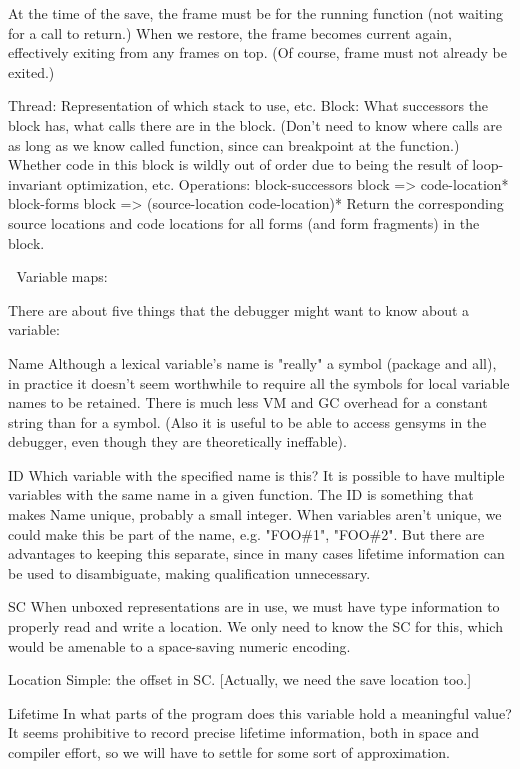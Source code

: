 	    At the time of the save, the frame must be for the running function
	    (not waiting for a call to return.)  When we restore, the frame
	    becomes current again, effectively exiting from any frames on top.
	    (Of course, frame must not already be exited.)
       
Thread:
        Representation of which stack to use, etc.
Block:
        What successors the block has, what calls there are in the block.
        (Don't need to know where calls are as long as we know called function,
        since can breakpoint at the function.)  Whether code in this block is
        wildly out of order due to being the result of loop-invariant
        optimization, etc.  Operations:
        block-successors block => code-location*
        block-forms block => (source-location code-location)*
            Return the corresponding source locations and code locations for
            all forms (and form fragments) in the block.


Variable maps:

There are about five things that the debugger might want to know about a
variable:

    Name
	Although a lexical variable's name is "really" a symbol (package and
	all), in practice it doesn't seem worthwhile to require all the symbols
	for local variable names to be retained.  There is much less VM and GC
	overhead for a constant string than for a symbol.  (Also it is useful
	to be able to access gensyms in the debugger, even though they are
	theoretically ineffable).

    ID
	Which variable with the specified name is this?  It is possible to have
	multiple variables with the same name in a given function.  The ID is
	something that makes Name unique, probably a small integer.  When
	variables aren't unique, we could make this be part of the name, e.g.
	"FOO\#1", "FOO\#2".  But there are advantages to keeping this separate,
	since in many cases lifetime information can be used to disambiguate,
	making qualification unnecessary.

    SC
	When unboxed representations are in use, we must have type information
	to properly read and write a location.  We only need to know the
	SC for this, which would be amenable to a space-saving
	numeric encoding.

    Location
	Simple: the offset in SC.  [Actually, we need the save location too.]

    Lifetime
	In what parts of the program does this variable hold a meaningful
	value?  It seems prohibitive to record precise lifetime information,
	both in space and compiler effort, so we will have to settle for some
	sort of approximation.

